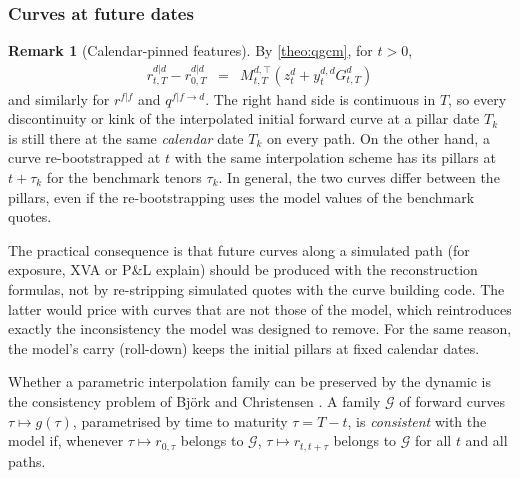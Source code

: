 \documentclass[11pt,english]{amsart}
\theoremstyle{definition}
\newtheorem{rema}{Remark}
\begin{document}
\subsubsection{Curves at future dates}

\begin{rema}[Calendar-pinned features]
By \autoref{theo:qgcm}, for $t>0$,
\begin{eqnarray*}
  r^{d|d}_{t,T} - r^{d|d}_{0,T} &=& M^{d,\top}_{t,T}\left(z^d_t + y^{d,d}_tG^d_{t,T}\right)
\end{eqnarray*}
and similarly for $r^{f|f}$ and $q^{f|f\to d}$. The right hand side is continuous in $T$, so every discontinuity or kink of the interpolated initial forward curve at a pillar date $T_k$ is still there at the same \emph{calendar} date $T_k$ on every path. On the other hand, a curve re-bootstrapped at $t$ with the same interpolation scheme has its pillars at $t+\tau_k$ for the benchmark tenors $\tau_k$. In general, the two curves differ between the pillars, even if the re-bootstrapping uses the model values of the benchmark quotes.

The practical consequence is that future curves along a simulated path (for exposure, XVA or P\&L explain) should be produced with the reconstruction formulas, not by re-stripping simulated quotes with the curve building code. The latter would price with curves that are not those of the model, which reintroduces exactly the inconsistency the model was designed to remove. For the same reason, the model's carry (roll-down) keeps the initial pillars at fixed calendar dates.
\end{rema}

Whether a parametric interpolation family can be preserved by the dynamic is the consistency problem of Bj\"ork and Christensen \cite{BjorkChristensen}. A family $\mathcal{G}$ of forward curves $\tau\mapsto g(\tau)$, parametrised by time to maturity $\tau = T-t$, is \emph{consistent} with the model if, whenever $\tau\mapsto r_{0,\tau}$ belongs to $\mathcal{G}$, $\tau\mapsto r_{t,t+\tau}$ belongs to $\mathcal{G}$ for all $t$ and all paths.
\end{document}
